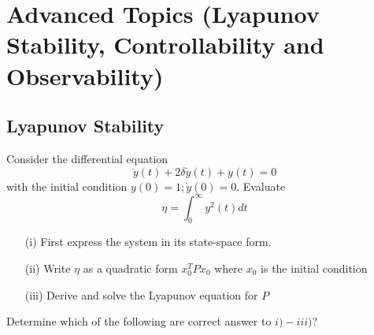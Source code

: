 \documentclass[12pt]{article}
\begin{document}
\section{Advanced Topics (Lyapunov Stability, Controllability and Observability)}
\subsection{Lyapunov Stability}

Consider the differential equation
\begin{equation}
    \ddot{y}(t) + 2\delta \dot{y}(t) + y(t) = 0
\end{equation}
with the initial condition \(y(0) = 1; \dot{y}(0) = 0\). Evaluate
\begin{equation}
    \eta = \int_0^{\infty} y^2(t) dt
\end{equation}

\begin{enumerate}
    \item[(i)] First express the system in its state-space form.
    \item[(ii)] Write \(\eta\) as a quadratic form \(x_0^TP x_0\) where \(x_0\) is the initial condition
    \item[(iii)] Derive and solve the Lyapunov equation for \(P\)
\end{enumerate}

Determine which of the following are correct answer to $i)-iii)$?
\end{document}
